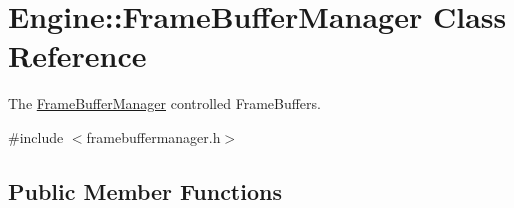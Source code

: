 \hypertarget{classEngine_1_1FrameBufferManager}{}\section{Engine\+:\+:Frame\+Buffer\+Manager Class Reference}
\label{classEngine_1_1FrameBufferManager}


The \hyperlink{classEngine_1_1FrameBufferManager}{Frame\+Buffer\+Manager} controlled Frame\+Buffers.  




{\ttfamily \#include $<$framebuffermanager.\+h$>$}

\subsection*{Public Member Functions}
